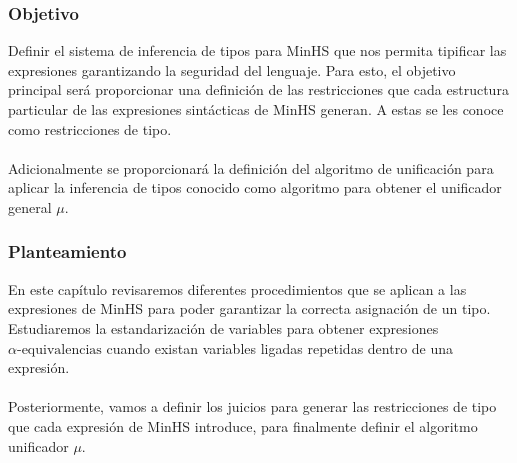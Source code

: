 \subsubsection{Objetivo}
Definir el sistema de inferencia de tipos para \textsf{MinHS} que nos permita tipificar las expresiones garantizando la seguridad del lenguaje. Para esto, el objetivo principal será proporcionar una definición de las restricciones que cada estructura particular de las expresiones sintácticas de \textsf{MinHS} generan. A estas se les conoce como restricciones de tipo. \\\\
Adicionalmente se proporcionará la definición del algoritmo de unificación para aplicar la inferencia de tipos conocido como algoritmo para obtener el unificador general \textbf{$\mu$}.


\subsubsection{Planteamiento}
En este capítulo  revisaremos diferentes  procedimientos que se aplican a las expresiones de \textsf{MinHS} para poder garantizar la correcta  asignación de un tipo.
Estudiaremos la estandarización de variables para obtener expresiones $\alpha\text{-equivalencias}$ cuando existan variables ligadas repetidas dentro de una expresión.\\\\
Posteriormente, vamos a definir los juicios para generar las restricciones de tipo que cada expresión de \textsf{MinHS} introduce, para finalmente definir el algoritmo unificador $\mu$.


